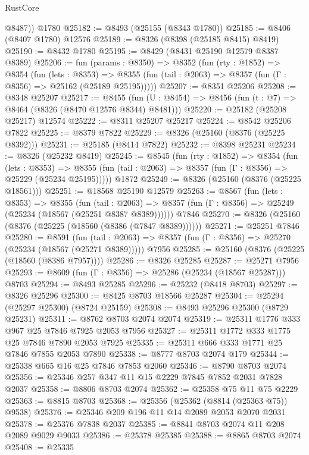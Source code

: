 \begin{lexlean}{RustCore}
\begin{coremodule}
        @8487))
    @1780
@25182 := @8493 (@25155 (@8343 @1780))
@25185 := @8406 (@8407 @1780) @12576
@25189 := @8326 (@8398 (@25185 @8415) @8419)
@25190 := @8432 @1780
@25195 := @8429 (@8431 @25190 @12579 @8387 @8389)
@25206 := fun (params : @8350) =>
  @8352
    (fun (rty : @1852) =>
    @8354
      (fun (lets : @8353) =>
      @8355 (fun (tail : @2063) => @8357 (fun (Γ : @8356) => @25162 (@25189 @25195)))))
@25207 := @8351 @25206
@25208 := @8348 @25207
@25217 := @8455
    (fun (U : @8454) => @8456 (fun (t : @7) => @8464 (@8326 (@8470 @12576 @8344) @8481)))
@25220 := @25182 (@25208 @25217) @12574
@25222 := @8311 @25207 @25217
@25224 := @8542 @25206 @7822
@25225 := @8379 @7822
@25229 := @8326 (@25160 (@8376 (@25225 @8392)))
@25231 := @25185 (@8414 @7822)
@25232 := @8398 @25231
@25234 := @8326 (@25232 @8419)
@25245 := @8545
    (fun (rty : @1852) =>
    @8354
      (fun (lets : @8353) =>
      @8355 (fun (tail : @2063) => @8357 (fun (Γ : @8356) => @25229 (@25234 @25195)))))
    @1872
@25249 := @8326 (@25160 (@8376 (@25225 @18561)))
@25251 := @18568 @25190 @12579
@25263 := @8567
    (fun (lets : @8353) =>
    @8355
      (fun (tail : @2063) =>
      @8357 (fun (Γ : @8356) => @25249 (@25234 (@18567 (@25251 @8387 @8389))))))
    @7846
@25270 := @8326 (@25160 (@8376 (@25225 (@18560 (@8386 (@7847 @8389))))))
@25271 := @25251 @7846
@25280 := @8591
    (fun (tail : @2063) => @8357 (fun (Γ : @8356) => @25270 (@25234 (@18567 (@25271 @8389)))))
    @7956
@25285 := @25160 (@8376 (@25225 (@18560 (@8386 @7957))))
@25286 := @8326 @25285
@25287 := @25271 @7956
@25293 := @8609 (fun (Γ : @8356) => @25286 (@25234 (@18567 @25287))) @8703
@25294 := @8493 @25285
@25296 := @25232 (@8418 @8703)
@25297 := @8326 @25296
@25300 := @8425 @8703 @18566 @25287
@25304 := @25294 (@25297 @25300) (@8724 @25159)
@25308 := @8493 @25296 @25300 (@8729 @25231)
@25311 := @8762 @8703 @2074 @2074
@25319 := @25311 @1776 @333 @967 @25 @7846 @7925 @2053 @7956
@25327 := @25311 @1772 @333 @1775 @25 @7846 @7890 @2053 @7925
@25335 := @25311 @666 @333 @1771 @25 @7846 @7855 @2053 @7890
@25338 := @8777 @8703 @2074 @179
@25344 := @25338 @665 @16 @25 @7846 @7853 @2060
@25346 := @8790 @8703 @2074
@25356 := @25346 @257 @347 @11 @15 @2229 @7845 @7852 @2031 @7828 @2037
@25358 := @8806 @8703 @2074
@25362 := @25358 @75 @11 @75 @2229
@25363 := @8815 @8703
@25368 := @25356 (@25362 (@8814 (@25363 @75)) @9538)
@25376 := @25346 @209 @196 @11 @14 @2089 @2053 @2070 @2031
@25378 := @25376 @7838 @2037
@25385 := @8841 @8703 @2074 @11 @208 @2089 @9029 @9033
@25386 := @25378 @25385
@25388 := @8865 @8703 @2074
@25408 := @25335

\end{coremodule}
\end{lexlean}
